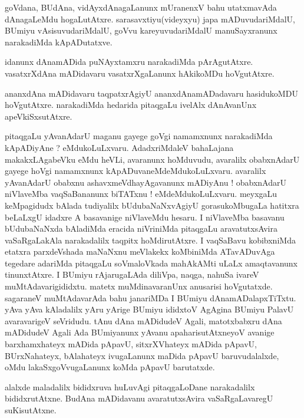 \documentclass{article}
\begin{document}
\begin{mn}%
goVdana, BUdAna, vidAyxdAnagaLanunx mUranenxV bahu utatxmavAda dAnagaLeMdu hogaLutAtxre. 
sarasavxtiyu(videyxyu) japa mADuvudariMdalU, BUmiyu vAsisuvudariMdalU, goVvu kareyuvudariMdalU 
manuSayxranunx narakadiMda kApADutatxve.
\end{mn}

\begin{mn}%
idanunx dAnamADida puNAyxtamxru narakadiMda pArAgutAtxre. vasatxrXdAna mADidavaru vasatxrXgaLanunx 
hAkikoMDu hoVgutAtxre.
\end{mn}

\begin{mn}%
ananxdAna mADidavaru taqpatxrAgiyU ananxdAnamADadavaru hasidukoMDU hoVgutAtxre. narakadiMda 
hedarida pitaqgaLu ivelAlx dAnAvanUnx apeVkiSxsutAtxre.
\end{mn}

\begin{mn}%
pitaqgaLu yAvanAdarU maganu gayege goVgi namamxnunx narakadiMda kApADiyAne ? eMdukoLuLxvaru. 
AdadxriMdaleV bahaLajana makakxLAgabeVku eMdu heVLi, avaranunx hoMduvudu, avaralilx obabxnAdarU 
gayege hoVgi namamxnunx kApADuvaneMdeMdukoLuLxvaru. avaralilx yAvanAdarU obabxnu 
ashavxmeVdhayAgavanunx mADiyAnu ! obabxnAdarU niVlaveMba vaqSaBananunx biTATxnu ! 
eMdeMdukoLuLxvaru. meyxgaLu keMpagidudx bAlada tudiyalilx bUdubaNaNxvAgiyU gorasukoMbugaLa hatitxra 
beLaLxgU idadxre A basavanige niVlaveMdu hesaru. I niVlaveMba basavanu bUdubaNaNxda bAladiMda 
eracida niVriniMda pitaqgaLu aravatutxsAvira vaSaRgaLakAla narakadalilx taqpitx hoMdirutAtxre. I 
vaqSaBavu kobibxniMda etatxra parxdeVshada maNaNxnu meVlakekx koMbiniMda ATavADuvAga tegedare 
adariMda pitaqgaLu soVmaloVkada mahAkAMti uLaLx amaqtavanunx tinunxtAtxre. I BUmiyu rAjarugaLAda 
diliVpa, naqga, nahuSa ivareV  muMtAdavarigididxtu. matetx muMdinavaranUnx anusarisi hoVgutatxde. 
sagaraneV muMtAdavarAda bahu janariMDa I BUmiyu dAnamADalapxTiTxtu. yAva yAva kAladalilx yAru 
yArige BUmiyu ididxtoV AgAgina BUmiyu PalavU avaravarigeV seVridudu. tAnu dAna mADidudeV Agali, 
matotxbabxru dAna mADidudeV Agali Ada BUmiyanunx yAvanu apaharisutAtxneyoV avanige barxhamxhateyx 
mADida pApavU, sitxrXVhateyx mADida pApavU, BUrxNahateyx, bAlahateyx ivugaLanunx maDida pApavU 
baruvudalalxde, oMdu lakaSxgoVvugaLanunx koMda pApavU barutatxde.
\end{mn}

\begin{mn}%
alalxde maladalilx bididxruva huLuvAgi pitaqgaLoDane narakadalilx bididxrutAtxne. BudAna mADidavanu 
avaratutxsAvira vaSaRgaLavaregU suKisutAtxne.
\end{mn}
\end{document}
